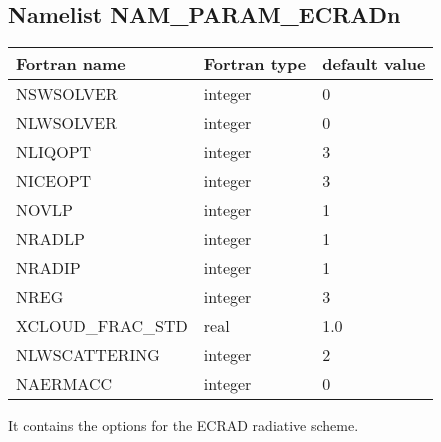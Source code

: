 \subsection{Namelist NAM\_PARAM\_ECRADn} 

\begin{center}
\begin{tabular} {|l|l|l|}
\hline
Fortran name & Fortran type & default value \\
\hline
NSWSOLVER & integer& 0\\
NLWSOLVER & integer& 0\\
NLIQOPT & integer&3\\
NICEOPT & integer&3 \\
NOVLP & integer& 1\\
NRADLP & integer& 1\\
NRADIP & integer&1 \\
NREG & integer& 3\\
XCLOUD\_FRAC\_STD & real &1.0\\
NLWSCATTERING & integer&2 \\
NAERMACC& integer&0 \\
\hline
\end{tabular}
\end{center}
It contains the options for the ECRAD radiative scheme.
